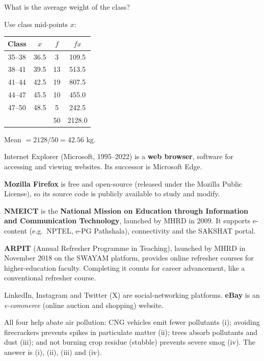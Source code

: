 What is the average weight of the class?

Use class mid-points $x$:
\begin{center}\small
\begin{tabular}{cccc}\toprule Class & $x$ & $f$ & $fx$\\\midrule
35--38 & 36.5 & 3 & 109.5\\ 38--41 & 39.5 & 13 & 513.5\\ 41--44 & 42.5 & 19 & 807.5\\ 44--47 & 45.5 & 10 & 455.0\\ 47--50 & 48.5 & 5 & 242.5\\\midrule
& & 50 & 2128.0\\\bottomrule\end{tabular}
\end{center}
Mean $=2128/50=\mathbf{42.56}$ kg.

Internet Explorer (Microsoft, 1995--2022) is a \textbf{web browser}, software for accessing and viewing websites. Its successor is Microsoft Edge.

\textbf{Mozilla Firefox} is free and open-source (released under the Mozilla Public License), so its source code is publicly available to study and modify.

\textbf{NMEICT} is the \textbf{National Mission on Education through Information and Communication Technology}, launched by MHRD in 2009. It supports e-content (e.g.\ NPTEL, e-PG Pathshala), connectivity and the SAKSHAT portal.

\textbf{ARPIT} (Annual Refresher Programme in Teaching), launched by MHRD in November 2018 on the SWAYAM platform, provides online refresher courses for higher-education faculty. Completing it counts for career advancement, like a conventional refresher course.

LinkedIn, Instagram and Twitter (X) are social-networking platforms. \textbf{eBay} is an \emph{e-commerce} (online auction and shopping) website.

All four help abate air pollution: CNG vehicles emit fewer pollutants (i); avoiding firecrackers prevents spikes in particulate matter (ii); trees absorb pollutants and dust (iii); and not burning crop residue (stubble) prevents severe smog (iv). The answer is (i), (ii), (iii) and (iv).

